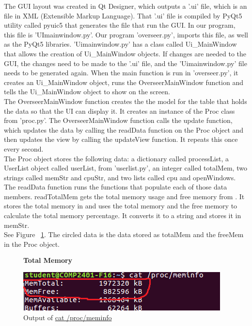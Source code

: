\documentclass[12pt]{article}
\begin{document}
The GUI layout was created in Qt Designer, which outputs a '.ui' file, which is an file in XML (Extensible Markup Language).
That '.ui' file is compiled by PyQt5 utility called pyuic5 that generates the file that run the GUI. In our program, this file is 'UImainwindow.py'. Our program  'overseer.py', imports this file, as well as the PyQt5 libraries. 
'Uimainwindow.py' has a class called Ui\_MainWindow that allows the creation of Ui\_MainWindow objects.
If changes are needed to the GUI, the changes need to be made to the '.ui' file, and the 'Uimainwindow.py' file needs to be generated again.
When the main function is run in 'overseer.py', it creates an Ui\_MainWindow object, runs the OverseerMainWindow function and tells the Ui\_MainWindow object to show on the screen.\\
The OverseerMainWindow function creates the the model for the table that holds the data so that the UI can display it.
It creates an instance of the Proc class from 'proc.py'.
The OverseerMainWindow function calls the update function, which updates the data by calling the readData function on the Proc object and then updates the view by calling the updateView function.
It repeats this once every second.\\
The Proc object stores the following data: a dictionary called processList, a UserList object called userList, from 'userlist.py', an integer called totalMem, two strings called memStr and cpuStr, and two lists called cpu and openWindows.\\
The readData function runs the functions that populate each of those data members.
readTotalMem gets the total memory usage and free memory from . It stores the total memory in and uses the total memory and the free memory to calculate the total memory percentage. It converts it to a string and stores it in memStr.\\
See Figure ~\ref{figTotalMem}.
The circled data is the data stored as totalMem and the freeMem in the Proc object.\\
\begin{figure}[h]
	\centering
	\textbf{Total Memory}\par\medskip
	\includegraphics{totalMem}
	\caption{Output of \url{cat /proc/meminfo}}
	\label{figTotalMem}
\end{figure}
\end{document}
